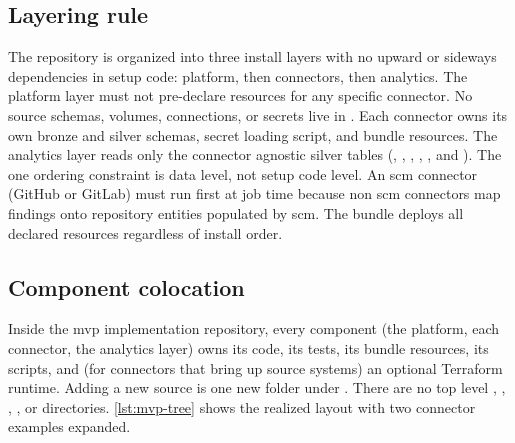 \subsection{Layering rule}
\label{sec:impl-layering-rule}

The repository is organized into three install layers with no upward or sideways dependencies in setup code: platform, then connectors, then analytics. The platform layer must not pre-declare resources for any specific connector. No source schemas, volumes, connections, or secrets live in . Each connector owns its own bronze and silver schemas, secret loading script, and bundle resources. The analytics layer reads only the connector agnostic silver tables (, , , , , and ). The one ordering constraint is data level, not setup code level. An \gls{scm} connector (GitHub or GitLab) must run first at job time because non \gls{scm} connectors map findings onto repository entities populated by \gls{scm}. The bundle deploys all declared resources regardless of install order.

\subsection{Component colocation}

Inside the \gls{mvp} implementation repository, every component (the platform, each connector, the analytics layer) owns its code, its tests, its bundle resources, its scripts, and (for connectors that bring up source systems) an optional Terraform runtime. Adding a new source is one new folder under . There are no top level , , , , or  directories. \autoref{lst:mvp-tree} shows the realized layout with two connector examples expanded.

